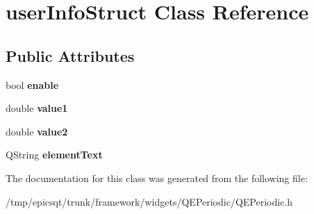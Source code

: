 \hypertarget{classuserInfoStruct}{
\section{userInfoStruct Class Reference}
\label{classuserInfoStruct}
}
\subsection*{Public Attributes}
\begin{DoxyCompactItemize}
\item 
\hypertarget{classuserInfoStruct_a85655a3c50f56a2dc88d85602ef7d89f}{
bool {\bfseries enable}}
\label{classuserInfoStruct_a85655a3c50f56a2dc88d85602ef7d89f}

\item 
\hypertarget{classuserInfoStruct_ac5f3011b1a5ce84414b25372e7030a98}{
double {\bfseries value1}}
\label{classuserInfoStruct_ac5f3011b1a5ce84414b25372e7030a98}

\item 
\hypertarget{classuserInfoStruct_af2952e70365f85470a21521ddcb52810}{
double {\bfseries value2}}
\label{classuserInfoStruct_af2952e70365f85470a21521ddcb52810}

\item 
\hypertarget{classuserInfoStruct_ad9960c8b05e048cf35baa158af9776f7}{
QString {\bfseries elementText}}
\label{classuserInfoStruct_ad9960c8b05e048cf35baa158af9776f7}

\end{DoxyCompactItemize}


The documentation for this class was generated from the following file:\begin{DoxyCompactItemize}
\item 
/tmp/epicsqt/trunk/framework/widgets/QEPeriodic/QEPeriodic.h\end{DoxyCompactItemize}
